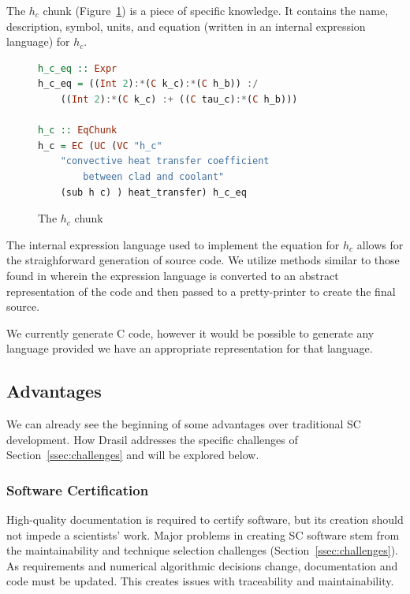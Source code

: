 \documentclass{sig-alternate-05-2015}
\newcommand{\lss}{Drasil}
\begin{document}
The $h_c$ chunk (Figure~\ref{fig:know_specific}) is a piece of specific
knowledge. It contains the name, description, symbol, units, and equation
(written in an internal expression language) for $h_c$.

\begin{figure}
\begin{lstlisting}[language=Haskell, frame=single, showstringspaces=false, basicstyle=\small]
h_c_eq :: Expr
h_c_eq = ((Int 2):*(C k_c):*(C h_b)) :/ 
    ((Int 2):*(C k_c) :+ ((C tau_c):*(C h_b)))

h_c :: EqChunk
h_c = EC (UC (VC "h_c" 
    "convective heat transfer coefficient 
        between clad and coolant"
    (sub h c) ) heat_transfer) h_c_eq
\end{lstlisting}
\caption{The $h_c$ chunk}
\label{fig:know_specific}
\end{figure}

The internal expression language used to implement the equation for $h_c$
allows for the straighforward generation of source code. We utilize methods
similar to those found in \cite{SAGA:DSL, Szymczak2014}
wherein the expression language is converted to an abstract representation of
the code and then passed to a pretty-printer to create the final source.

We currently generate C code, however it would be possible to generate any
language provided we have an appropriate representation for that language.
\subsection{Advantages} \label{ssec:advantages}

We can already see the beginning of some advantages over traditional SC
development. How \lss{} addresses the specific challenges of
Section~\ref{ssec:challenges} and will be explored below.

\subsubsection{Software Certification} \label{sssec:adv_cert}

High-quality documentation is required to certify software, but its creation
should not impede a scientists' work.  Major problems in creating SC software
stem from the maintainability and technique selection challenges
(Section~\ref{ssec:challenges}). As requirements and numerical algorithmic
decisions change, documentation and code must be updated.  This creates issues
with traceability and maintainability.
\end{document}
